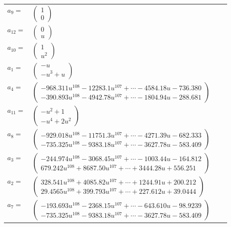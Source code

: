 \documentclass[1p]{elsarticle_modified}
\theoremstyle{definition}
\begin{document}
\begin{tabular}{m{7pt} m{180pt} m{7pt} m{180pt} }
\flushright $a_{9}=$&$\begin{pmatrix}1\\0\end{pmatrix}$ \\
\flushright $a_{12}=$&$\begin{pmatrix}0\\u\end{pmatrix}$ \\
\flushright $a_{10}=$&$\begin{pmatrix}1\\u^2\end{pmatrix}$ \\
\flushright $a_{1}=$&$\begin{pmatrix}- u\\- u^3+u\end{pmatrix}$ \\
\flushright $a_{4}=$&$\begin{pmatrix}-968.311 u^{108}-12283.1 u^{107}+\cdots-4584.18 u-736.380\\-390.893 u^{108}-4942.78 u^{107}+\cdots-1804.94 u-288.681\end{pmatrix}$ \\
\flushright $a_{11}=$&$\begin{pmatrix}- u^2+1\\- u^4+2 u^2\end{pmatrix}$ \\
\flushright $a_{8}=$&$\begin{pmatrix}-929.018 u^{108}-11751.3 u^{107}+\cdots-4271.39 u-682.333\\-735.325 u^{108}-9383.18 u^{107}+\cdots-3627.78 u-583.409\end{pmatrix}$ \\
\flushright $a_{3}=$&$\begin{pmatrix}-244.974 u^{108}-3068.45 u^{107}+\cdots-1003.44 u-164.812\\679.242 u^{108}+8687.50 u^{107}+\cdots+3444.28 u+556.251\end{pmatrix}$ \\
\flushright $a_{2}=$&$\begin{pmatrix}328.541 u^{108}+4085.82 u^{107}+\cdots+1244.91 u+200.212\\29.4565 u^{108}+399.793 u^{107}+\cdots+227.612 u+39.0444\end{pmatrix}$ \\
\flushright $a_{7}=$&$\begin{pmatrix}-193.693 u^{108}-2368.15 u^{107}+\cdots-643.610 u-98.9239\\-735.325 u^{108}-9383.18 u^{107}+\cdots-3627.78 u-583.409\end{pmatrix}$ \\

\end{tabular}
\end{document}

